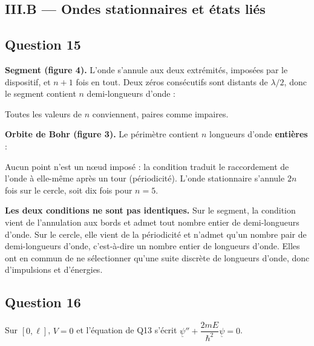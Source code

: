 \documentclass[11pt,a4paper]{article}
\newcommand{\equationajustee}[1]{%
  \sbox{\boiteequation}{$\displaystyle #1$}%
  \ifdim\wd\boiteequation>\linewidth
    \[\resizebox{\linewidth}{!}{\usebox{\boiteequation}}\]%
  \else
    \[#1\]%
  \fi}
\begin{document}
\hypertarget{iii.b-ondes-stationnaires-et-uxe9tats-liuxe9s}{%
\subsection{III.B --- Ondes stationnaires et états liés}\label{iii.b-ondes-stationnaires-et-uxe9tats-liuxe9s}}

\hypertarget{question-15}{%
\subsection{Question 15}\label{question-15}}

\textbf{Segment (figure 4).} L'onde s'annule aux deux extrémités, imposées par le dispositif, et \(n+1\) fois en tout. Deux zéros consécutifs sont distants de \(\lambda/2\), donc le segment contient \(n\) demi-longueurs d'onde :

\equationajustee{\ell=n\,\frac{\lambda}{2},\ n\in\mathbb N^*.}

Toutes les valeurs de \(n\) conviennent, paires comme impaires.

\textbf{Orbite de Bohr (figure 3).} Le périmètre contient \(n\) longueurs d'onde \textbf{entières} :

\equationajustee{\begin{aligned}
2\pi r&=n\lambda\\
&=2n\,\frac{\lambda}{2}.
\end{aligned}}

Aucun point n'est un nœud imposé : la condition traduit le raccordement de l'onde à elle-même après un tour (périodicité). L'onde stationnaire s'annule \(2n\) fois sur le cercle, soit dix fois pour \(n=5\).

\textbf{Les deux conditions ne sont pas identiques.} Sur le segment, la condition vient de l'annulation aux bords et admet tout nombre entier de demi-longueurs d'onde. Sur le cercle, elle vient de la périodicité et n'admet qu'un nombre pair de demi-longueurs d'onde, c'est-à-dire un nombre entier de longueurs d'onde. Elles ont en commun de ne sélectionner qu'une suite discrète de longueurs d'onde, donc d'impulsions et d'énergies.

\hypertarget{question-16}{%
\subsection{Question 16}\label{question-16}}

Sur \([0,\ell]\), \(V=0\) et l'équation de Q13 s'écrit \(\underline\psi''+\dfrac{2mE}{\hbar^2}\underline\psi=0\).
\end{document}
